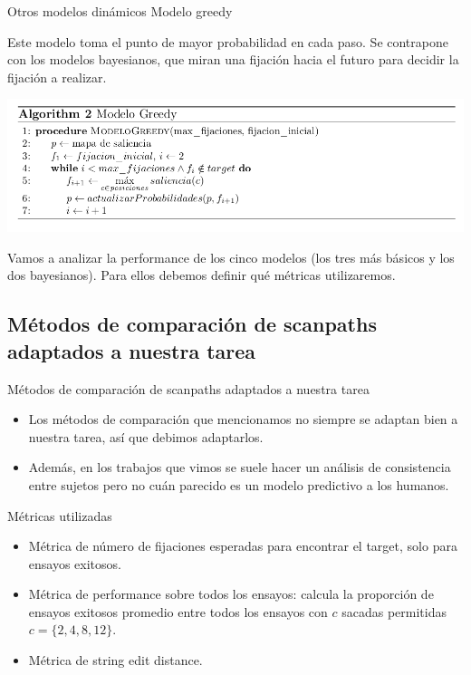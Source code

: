 \documentclass[compress]{beamer}
\begin{document}
\begin{frame}{Otros modelos dinámicos}
{Modelo greedy}

Este modelo toma el punto de mayor probabilidad en cada paso. Se contrapone con los modelos bayesianos, que miran una fijación hacia el futuro para decidir la fijación a realizar. 

\begin{center}
\includegraphics[width=\textwidth]{images/modelo-greedy.png}
\end{center}

\end{frame}

\begin{frame}
Vamos a analizar la performance de los cinco modelos (los tres más básicos y los dos bayesianos). Para ellos debemos definir qué métricas utilizaremos.
\end{frame}


\subsection{Métodos de comparación de scanpaths adaptados a nuestra tarea}
\begin{frame}{Métodos de comparación de scanpaths adaptados a nuestra tarea}

\begin{itemize}
\item Los métodos de comparación que mencionamos no siempre se adaptan bien a nuestra tarea, así que debimos adaptarlos.
\item Además, en los trabajos que vimos se suele hacer un análisis de consistencia entre sujetos pero no cuán parecido es un modelo predictivo a los humanos.
\end{itemize}
\end{frame}

\begin{frame}{Métricas utilizadas}
\begin{itemize}
\item Métrica de número de fijaciones esperadas para
encontrar el target, solo para ensayos exitosos.
\item Métrica de performance sobre todos los ensayos: calcula la proporción de ensayos exitosos promedio entre todos los ensayos con $c$ sacadas permitidas $c = \{2,4,8,12\}$.
\item Métrica de string edit distance.
\end{itemize}
\end{frame}
\end{document}
